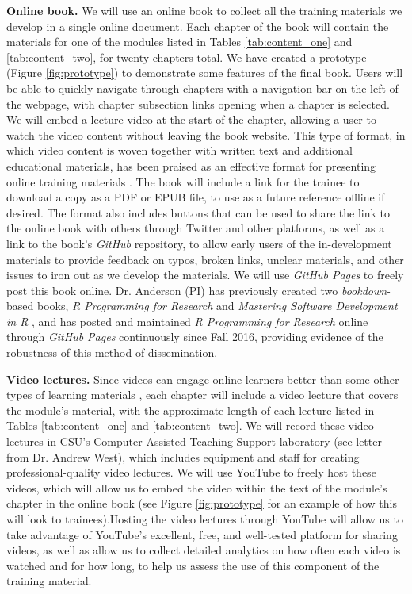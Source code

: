 \documentclass[pdftex,english,11pt,parskip=half]{scrartcl}
\begin{document}
\textbf{Online book.} We will use an online book to collect all the training
materials we develop in a single online document. Each chapter of the book will contain the
materials for one of the modules listed in Tables \ref{tab:content_one} and
\ref{tab:content_two}, for twenty chapters total. We have created a prototype
(Figure \ref{fig:prototype}) to demonstrate some features of the final book.
Users will be able to quickly navigate through chapters with a navigation bar on
the left of the webpage, with chapter subsection links opening when a chapter is
selected. We will embed a lecture video at the start of the chapter, allowing
a user to watch the video content without leaving the book website. This type of format, 
in which video content is woven together with written text and additional educational materials, has been
praised as an effective format for presenting online training materials \cite{searls2012online}.
The book will
include a link for the trainee to download a copy as a PDF or EPUB file, to use
as a future reference offline if desired. The format also includes buttons that
can be used to share the link to the online book with others through Twitter and
other platforms, as well as a link to the book's \textit{GitHub} repository, to allow
early users of the in-development materials to provide feedback on typos, broken
links, unclear materials, and other issues to iron out as we develop the
materials. 
We will use \textit{GitHub Pages} to
freely post this book online. Dr. Anderson (PI) has previously created two
\textit{bookdown}-based books, \textit{R Programming for Research} \cite{andersoncoursebook} and
\textit{Mastering Software Development in R} \cite{andersonmastering}, and has posted and maintained
\textit{R Programming for Research} online through \textit{GitHub Pages} continuously since Fall 2016, providing evidence of the robustness of this method of dissemination.  

\textbf{Video lectures.} 
Since videos can engage online learners better than some other types of learning materials \cite{searls2012ten}, each chapter will include a video lecture that covers
the module's material, with the approximate length of each lecture listed in
Tables \ref{tab:content_one} and \ref{tab:content_two}. We will record these
video lectures in CSU's Computer Assisted Teaching Support laboratory (see
letter from Dr. Andrew West), which includes equipment and staff for creating
professional-quality video lectures. We will use YouTube to freely host these
videos, which will allow us to embed the video within the text of the module's chapter in the
online book (see Figure \ref{fig:prototype} for an example of how this will look
to trainees).Hosting the video lectures through YouTube will allow
us to take advantage of YouTube's excellent, free, and well-tested platform for
sharing videos, as well as allow us to collect detailed analytics on how often
each video is watched and for how long, to help us assess the use of this
component of the training material. 
\end{document}
